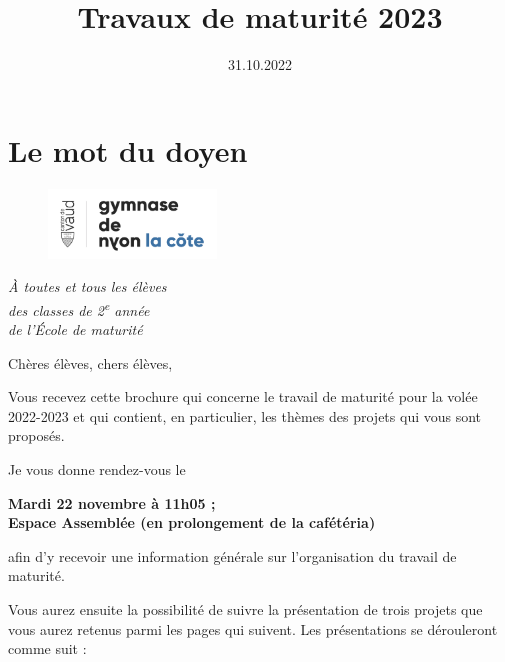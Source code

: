 \documentclass[
  10pt,
  french,
  a5paper,
  openany]{book}
\title{Travaux de maturité 2023}
\author{}
\date{\vspace{-2.5em}31.10.2022}
\newenvironment{signature}{\begin{flushright}}{\end{flushright}}
\begin{document}
\maketitle

{
\setcounter{tocdepth}{0}
\tableofcontents
}
\hypertarget{le-mot-du-doyen}{%
\chapter*{Le mot du doyen}\label{le-mot-du-doyen}}

\begin{figure}

\includegraphics[height=5em]{images/logoGNLC} \hfill{}

\end{figure}


\begin{signature}
\emph{À toutes et tous les élèves}\\
\emph{des classes de 2\textsuperscript{e} année}\\
\emph{de l'École de maturité}

\end{signature}


Chères élèves, chers élèves,

Vous recevez cette brochure qui concerne le travail de maturité pour la volée 2022-2023 et qui contient, en particulier, les thèmes des projets qui vous sont proposés.

Je vous donne rendez-vous le

\begin{center}
\textbf{Mardi 22 novembre à 11h05 ;\\
Espace Assemblée (en prolongement de la cafétéria)}

\end{center}

afin d'y recevoir une information générale sur l'organisation du travail de maturité.

Vous aurez ensuite la possibilité de suivre la présentation de trois projets que vous aurez retenus parmi les pages qui suivent. Les présentations se dérouleront comme suit :
\end{document}

